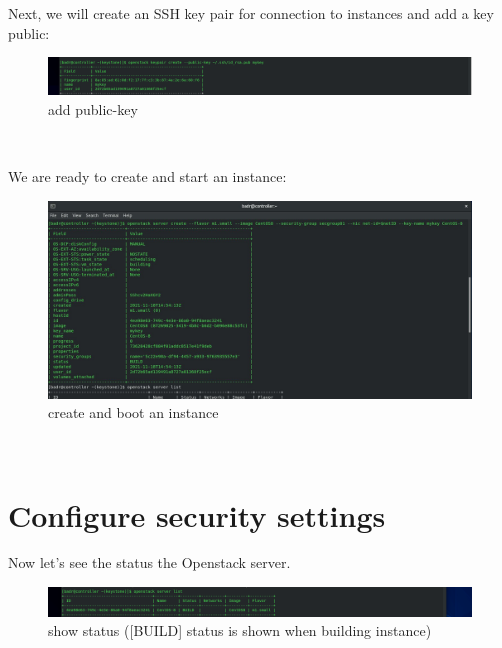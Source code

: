 \begin{spacing}{1.2}
\par Next, we will create an SSH key pair for connection to instances and add a key
public:
\\
\begin{figure}[!htb] 
\begin{center} 
\includegraphics[width=1\linewidth]{Cloud/Creating and Running Instances/add public-key} 
\end{center} 
\caption{add public-key} 
\end{figure} 
\FloatBarrier
\\
\par We are ready to create and start an instance: 
\\
\begin{figure}[!htb] 
\begin{center} 
\includegraphics[width=1\linewidth]{Cloud/Creating and Running Instances/create and boot an instance} 
\end{center} 
\caption{create and boot an instance} 
\end{figure} 
\FloatBarrier
\\

\section{Configure security settings}





\par Now let's see the status the Openstack server.
\\
\begin{figure}[!htb] 
\begin{center} 
\includegraphics[width=1\linewidth]{Cloud/Creating and Running Instances/show status ([BUILD] status is shown when building instance)} 
\end{center} 
\caption{show status ([BUILD] status is shown when building instance)} 
\end{figure} 
\FloatBarrier
\\



\end{spacing}
